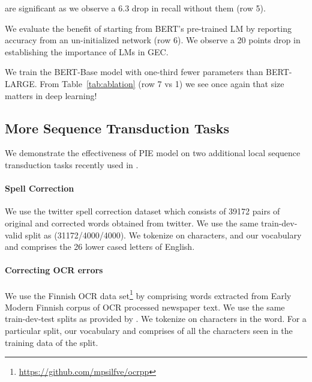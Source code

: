 \documentclass[11pt,a4paper]{article}
\begin{document}
 are significant as we observe a 6.3 drop in recall without them (row 5).

We evaluate the benefit of starting from BERT's pre-trained LM by reporting accuracy from an un-initialized network (row 6).  We observe a 20 points drop in  establishing the importance of LMs in GEC.

We train the BERT-Base model with one-third fewer parameters than BERT-LARGE. From Table~\ref{tab:ablation} (row 7 vs 1) we see once again that size matters in deep learning! 

\iffalse
\paragraph{Importance of Copy Weight}
We evaluate the effect of the hyper-parameter used to down-weigh loss for a wrongly predicted copy label in the last three rows of Table~\ref{tab:ablation}. Higher weights make the model more conservative in predicting non-copy edits, and increase precision. Lower weights increase recall. Using the dev set we choose 0.4 as it provided the best balance between precision and recall.
\fi


\subsection{More Sequence Transduction Tasks}
\label{sec:others}
We demonstrate the effectiveness of PIE model on two additional local sequence transduction tasks recently used in \cite{Ribeiro2018}.

\paragraph{Spell Correction}
We use the twitter spell correction dataset \cite{aramaki2010typo} which consists of 39172 pairs of original and corrected words obtained from twitter. 
We use the same train-dev-valid split as \cite{Ribeiro2018} (31172/4000/4000). We tokenize on characters, and our vocabulary  and  comprises the 26 lower cased letters of English. 

\paragraph{Correcting OCR errors}
We use the Finnish OCR data set\footnote{\url{https://github.com/mpsilfve/ocrpp}} by \cite{silfverberg2016data} comprising words extracted from Early Modern Finnish corpus of OCR processed newspaper text. 
We use the same train-dev-test splits as provided by \cite{silfverberg2016data}.
We tokenize on characters in the word.
For a particular split, our vocabulary  and  comprises of all the characters seen in the training data of the split. 
\end{document}
